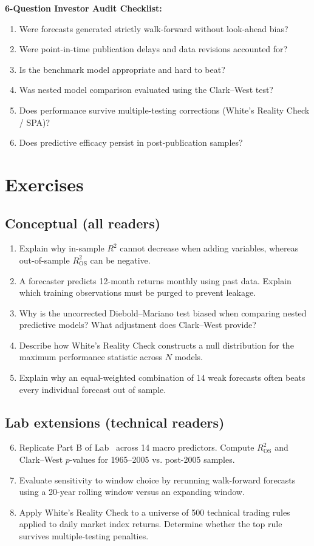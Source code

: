 \textbf{6-Question Investor Audit Checklist:}
\begin{enumerate}
  \item Were forecasts generated strictly walk-forward without look-ahead bias?
  \item Were point-in-time publication delays and data revisions accounted for?
  \item Is the benchmark model appropriate and hard to beat?
  \item Was nested model comparison evaluated using the Clark--West test?
  \item Does performance survive multiple-testing corrections (White's Reality Check / SPA)?
  \item Does predictive efficacy persist in post-publication samples?
\end{enumerate}

\section*{Exercises}

\subsection*{Conceptual (all readers)}
\begin{enumerate}
  \item Explain why in-sample $R^2$ cannot decrease when adding variables, whereas out-of-sample $R^2_{\text{OS}}$ can be negative.
  \item A forecaster predicts 12-month returns monthly using past data. Explain which training observations must be purged to prevent leakage.
  \item Why is the uncorrected Diebold--Mariano test biased when comparing nested predictive models? What adjustment does Clark--West provide?
  \item Describe how White's Reality Check constructs a null distribution for the maximum performance statistic across $N$ models.
  \item Explain why an equal-weighted combination of 14 weak forecasts often beats every individual forecast out of sample.
\end{enumerate}

\subsection*{Lab extensions (technical readers)}
\begin{enumerate}
  \setcounter{enumi}{5}
  \item Replicate Part B of Lab~\thechapter{} across 14 macro predictors. Compute $R^2_{\text{OS}}$ and Clark--West $p$-values for 1965--2005 vs. post-2005 samples.
  \item Evaluate sensitivity to window choice by rerunning walk-forward forecasts using a 20-year rolling window versus an expanding window.
  \item Apply White's Reality Check to a universe of 500 technical trading rules applied to daily market index returns. Determine whether the top rule survives multiple-testing penalties.
\end{enumerate}

